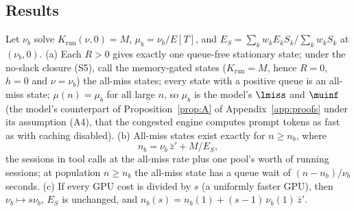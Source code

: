 \subsection{Results}\label{sec:fp-results}
\begin{proposition}\label{prop:nb}
Let $\nu_b$ solve $K_{\mathrm{run}}(\nu,0)=M$, $\mu_b=\nu_b/E[T]$, and $E_S=\sum_kw_kE_kS_k/\sum_kw_kS_k$ at $(\nu_b,0)$.
(a) Each $R>0$ gives exactly one queue-free stationary state; under the no-slack closure (S5), call the memory-gated states ($K_{\mathrm{run}}=M$, hence $R=0$, $h=0$ and $\nu=\nu_b$) the all-miss states; every state with a positive queue is an all-miss state; $\mu(n)=\mu_b$ for all large $n$, so $\mu_b$ is the model's $\lmiss$ and $\muinf$ (the model's counterpart of Proposition~\ref{prop:A} of Appendix~\ref{app:proofs} under its assumption (A4), that the congested engine computes prompt tokens as fast as with caching disabled).
(b) All-miss states exist exactly for $n\ge n_b$, where
\begin{equation}\label{eq:nb}
n_b=\nu_b\,\bar z'+M/E_S,
\end{equation}
the sessions in tool calls at the all-miss rate plus one pool's worth of running sessions; at population $n\ge n_b$ the all-miss state has a queue wait of $(n-n_b)/\nu_b$ seconds.
(c) If every GPU cost is divided by $s$ (a uniformly faster GPU), then $\nu_b\mapsto s\nu_b$, $E_S$ is unchanged, and $n_b(s)=n_b(1)+(s-1)\,\nu_b(1)\,\bar z'$.
\end{proposition}
